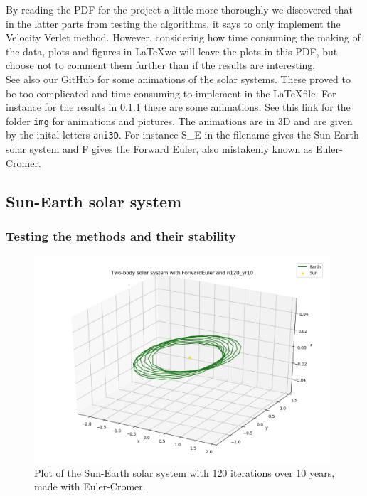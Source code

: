 \documentclass{article}
\begin{document}
    By reading the PDF for the project a little more thoroughly we discovered that in the latter parts from testing the algorithms, it says to only implement the Velocity Verlet method. However, considering how time consuming the making of the data, plots and figures in \LaTeX we will leave the plots in this PDF, but choose not to comment them further than if the results are interesting. \\

    See also our GitHub for some animations of the solar systems. These proved to be too complicated and time consuming to implement in the \LaTeX file. For instance for the results in \ref{sec:resultsstabilitySE} there are some animations. See this \href{https://github.com/Erikbgram/Fys3150/tree/master/Project\%205/img}{link} for the folder \texttt{img} for animations and pictures. The animations are in 3D and are given by the inital letters \texttt{ani3D}. For instance S\_E in the filename gives the Sun-Earth solar system and F gives the Forward Euler, also mistakenly known as Euler-Cromer.  \\


\subsection{Sun-Earth solar system}

\subsubsection{Testing the methods and their stability}     \label{sec:resultsstabilitySE}

    \begin{figure}[H]
        \centering
        \includegraphics[width = 11cm]{img/plot3D_S_E_F_n120_yr10.png}
        \caption{Plot of the Sun-Earth solar system with 120 iterations over 10 years, made with Euler-Cromer. }
        \label{fig:plot3D_S_E_F_n120_yr10}
    \end{figure}
\end{document}
